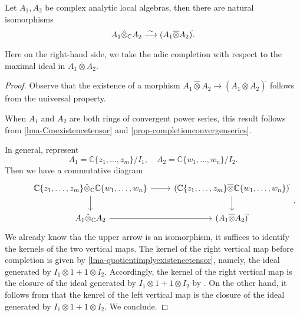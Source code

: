 \begin{thm}\label{thm-complocalringtest}
    Let $A_1,A_2$ be complex analytic local algebras, then there are natural isomorphisms
    \[
      A_1\hat{\otimes}_{\mathbb{C}} A_2 \stackrel{\sim}{\longrightarrow}  (A_1\overline{\otimes} A_2)^{\hat{}}.
    \]
\end{thm}
Here on the right-hand side, we take the adic completion with respect to the maximal ideal in $A_1\overline{\otimes} A_2$.
\begin{proof}
    Observe that the existence of a morphism $A_1\hat{\otimes} A_2 \rightarrow  (A_1\overline{\otimes} A_2)^{\hat{}}$ follows from the universal property.

    When $A_1$ and $A_2$ are both rings of convergent power series, this result follows from \cref{lma-Cmexistencetensor} and \cref{prop-completionconvergenseries}. 

    In general, represent 
    \[
        A_1=\mathbb{C}\{ z_1,\ldots,z_m\}/I_1,\quad   A_2=\mathbb{C}\{ w_1,\ldots,w_n\}/I_2.
    \]
    Then we have a commutative diagram
    \[ 
    \begin{tikzcd}
        & \mathbb{C}\{ z_1,\ldots,z_m\} \hat{\otimes}_{\mathbb{C}}  \mathbb{C}\{ w_1,\ldots,w_n\} \arrow[r]\arrow[d] & (\mathbb{C}\{ z_1,\ldots,z_m\}\overline{\otimes} \mathbb{C}\{ w_1,\ldots,w_n\})^{\hat{}} \arrow[d]\\
        & A_1\hat{\otimes}_{\mathbb{C}} A_2 \arrow[r] & (A_1\overline{\otimes} A_2)^{\hat{}}
    \end{tikzcd}.
    \]
    We already know tha the upper arrow is an isomorphism, it suffices to identify the kernels of the two vertical maps. The kernel of the right vertical map before completion is given by \cref{lma-quotientimplyexistencetensor}, namely, the ideal generated by $I_1\otimes 1+1\otimes I_2$. Accordingly, the kernel of the right vertical map is the closure of the ideal generated by $I_1\otimes 1+1\otimes I_2$ by \cite[\href{https://stacks.math.columbia.edu/tag/0ARZ}{Tag 0ARZ}]{stacks-project}. On the other hand, it follows from \cite[\href{https://stacks.math.columbia.edu/tag/0ARZ}{Tag 0ARZ}]{stacks-project} that the kenrel of the left vertical map is the closure of the ideal generated by $I_1\otimes 1+1\otimes I_2$. We conclude.
\end{proof}

